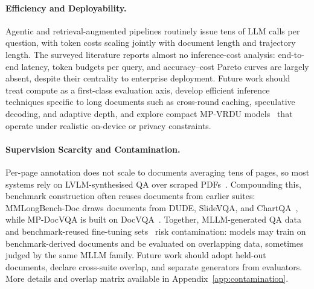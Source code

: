 \documentclass[11pt]{article}
\begin{document}
\paragraph{Efficiency and Deployability.}
\label{sec:efficiency}
Agentic and retrieval-augmented pipelines routinely issue tens of LLM calls per question, with token costs scaling jointly with document length and trajectory length. The surveyed literature reports almost no inference-cost analysis: end-to-end latency, token budgets per query, and accuracy–cost Pareto curves are largely absent, despite their centrality to enterprise deployment. Future work should treat compute as a first-class evaluation axis, develop efficient inference techniques specific to long documents such as cross-round caching, speculative decoding, and adaptive depth, and explore compact MP-VRDU models~\cite{hannan2025docslm} that operate under realistic on-device or privacy constraints.

\paragraph{Supervision Scarcity and Contamination.}
\label{sec:supervision}
Per-page annotation does not scale to documents averaging tens of pages, so most systems rely on LVLM-synthesised QA over scraped PDFs~\cite{tanaka2024instructdoc, jain2025simpledoc, xiong2026docr1, zhang2026docdancer}. Compounding this, benchmark construction often reuses documents from earlier suites: MMLongBench-Doc draws documents from DUDE, SlideVQA, and ChartQA~\cite{ma2024mmlongbench}, while MP-DocVQA is built on DocVQA~\cite{tito2023hierarchical, mathew2021docvqa}. Together, MLLM-generated QA data~\cite{deng2025longdocurl} and benchmark-reused fine-tuning sets~\cite{xiong2026docr1, duan2025docopilot} risk contamination: models may train on benchmark-derived documents and be evaluated on overlapping data, sometimes judged by the same MLLM family. Future work should adopt held-out documents, declare cross-suite overlap, and separate generators from evaluators. More details and overlap matrix available in Appendix~\ref{app:contamination}.
\end{document}

